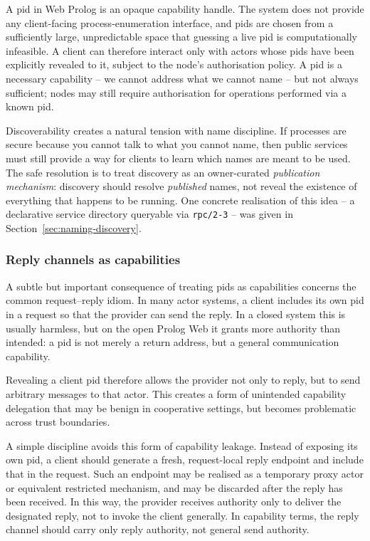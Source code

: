 A pid in Web Prolog is an opaque capability handle. The system does
not provide any client-facing process-enumeration interface, and pids
are chosen from a sufficiently large, unpredictable space that
guessing a live pid is computationally infeasible. A client can
therefore interact only with actors whose pids have been explicitly
revealed to it, subject to the node's authorisation policy. A pid is
a necessary capability -- we cannot address what we cannot name --
but not always sufficient; nodes may still require authorisation for
operations performed via a known pid.

Discoverability creates a natural tension with name discipline. If
processes are secure because you cannot talk to what you cannot name,
then public services must still provide a way for clients to learn
which names are meant to be used. The safe resolution is to treat
discovery as an owner-curated \emph{publication mechanism}: discovery
should resolve \emph{published} names, not reveal the existence of
everything that happens to be running. One concrete realisation of
this idea -- a declarative service directory queryable via
\texttt{rpc/2-3} -- was given in
Section~\ref{sec:naming-discovery}.

\subsubsection{Reply channels as capabilities}

A subtle but important consequence of treating pids as capabilities
concerns the common request--reply idiom. In many actor systems, a
client includes its own pid in a request so that the provider can
send the reply. In a closed system this is usually harmless, but on
the open Prolog Web it grants more authority than intended: a pid is
not merely a return address, but a general communication capability.

Revealing a client pid therefore allows the provider not only to
reply, but to send arbitrary messages to that actor. This
creates a form of unintended capability delegation that may be
benign in cooperative settings, but becomes problematic across
trust boundaries.

A simple discipline avoids this form of capability leakage. Instead of exposing its own pid, a client should generate a fresh, request-local reply
endpoint and include that in the request. Such an endpoint may be
realised as a temporary proxy actor or equivalent restricted mechanism, and
may be discarded after the reply has been received. In this way,
the provider receives authority only to deliver the designated
reply, not to invoke the client generally. In capability terms, the reply channel should carry only reply authority, not general send authority.

